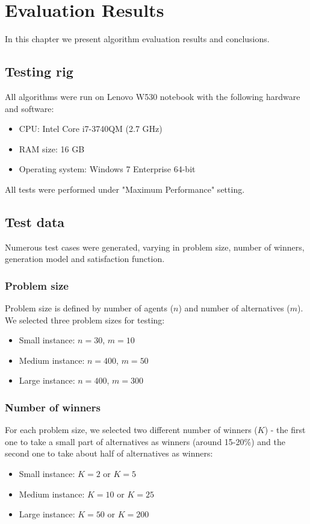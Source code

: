 \chapter{Evaluation Results}
\label{cha:evaluationResults}

In this chapter we present algorithm evaluation results and conclusions.

\section{Testing rig}

All algorithms were run on Lenovo W530 notebook with the following hardware and software:
\begin{itemize}
	\item CPU: Intel Core i7-3740QM (2.7 GHz)
	\item RAM size: 16 GB
	\item Operating system: Windows 7 Enterprise 64-bit
\end{itemize}

All tests were performed under "Maximum Performance" setting.

\section{Test data}

Numerous test cases were generated, varying in problem size, number of winners, generation model and satisfaction function.

\subsection{Problem size}

Problem size is defined by number of agents ($n$) and number of alternatives ($m$). We selected three problem sizes for testing:
\begin{itemize}
	\item Small instance: $n = 30$, $m = 10$
	\item Medium instance: $n = 400$, $m = 50$
	\item Large instance: $n = 400$, $m = 300$
\end{itemize}

\subsection{Number of winners}

For each problem size, we selected two different number of winners ($K$) - the first one to take a small part of alternatives as winners (around 15-20\%) and the second one to take about half of alternatives as winners:
\begin{itemize}
	\item Small instance: $K = 2$ or $K = 5$
	\item Medium instance: $K = 10$ or $K = 25$
	\item Large instance: $K = 50$ or $K = 200$
\end{itemize}

